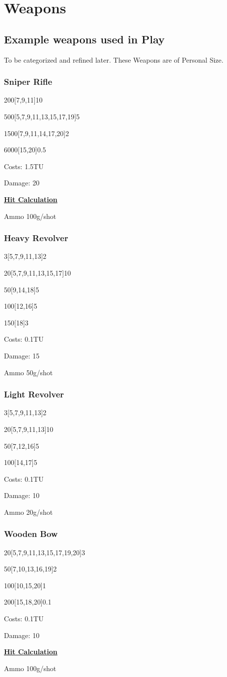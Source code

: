 \section{Weapons}\label{sec:weapons}
\subsection{Example weapons used in Play}\label{subsec:example-weapons-used-in-play}
To be categorized and refined later.
These Weapons are of Personal Size.
\subsubsection{Sniper Rifle}
200[7,9,11]10\par
500[5,7,9,11,13,15,17,19]5\par
1500[7,9,11,14,17,20]2\par
6000[15,20]0.5\par
Costs: 1.5TU\par
Damage: 20\par
\hyperref[subsec:hit]{\textbf{Hit Calculation}} \par
[0,80,100,150]
Ammo 100g/shot

\subsubsection{Heavy Revolver}
3[5,7,9,11,13]2\par
20[5,7,9,11,13,15,17]10\par
50[9,14,18]5\par
100[12,16]5\par
150[18]3\par
Costs: 0.1TU\par
Damage: 15\par
Ammo 50g/shot

\subsubsection{Light Revolver}
3[5,7,9,11,13]2\par
20[5,7,9,11,13]10\par
50[7,12,16]5\par
100[14,17]5\par
Costs: 0.1TU\par
Damage: 10\par
Ammo 20g/shot

\subsubsection{Wooden Bow}
20[5,7,9,11,13,15,17,19,20]3\par
50[7,10,13,16,19]2\par
100[10,15,20]1\par
200[15,18,20]0.1\par
Costs: 0.1TU\par
Damage: 10\par
\hyperref[subsec:hit]{\textbf{Hit Calculation}} \par
[0,80,100,150]
Ammo 100g/shot

